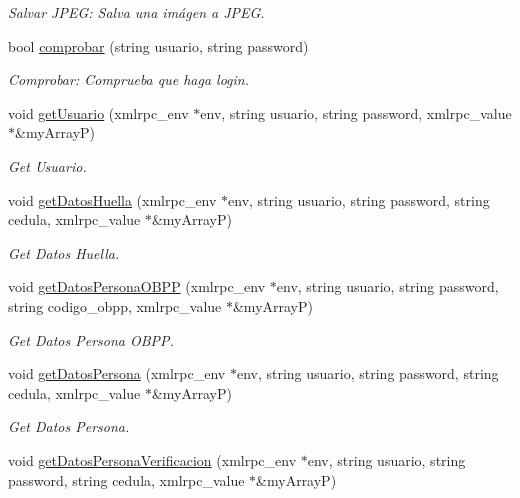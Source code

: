 \begin{DoxyCompactItemize}
\begin{DoxyCompactList}\small\item\em Salvar J\+P\+EG\+: Salva una imágen a J\+P\+EG. \end{DoxyCompactList}\item 
bool \hyperlink{classTemplateAFIS__webservice_a5491ba1e8737a0adea2527fcbbc428af}{comprobar} (string usuario, string password)
\begin{DoxyCompactList}\small\item\em Comprobar\+: Comprueba que haga login. \end{DoxyCompactList}\item 
void \hyperlink{classTemplateAFIS__webservice_a11ad395942529648ef3a9ddf43df3262}{get\+Usuario} (xmlrpc\+\_\+env $\ast$env, string usuario, string password, xmlrpc\+\_\+value $\ast$\&my\+ArrayP)
\begin{DoxyCompactList}\small\item\em Get Usuario. \end{DoxyCompactList}\item 
void \hyperlink{classTemplateAFIS__webservice_aeb75c2999e3b58cbf800b9f9ffea082c}{get\+Datos\+Huella} (xmlrpc\+\_\+env $\ast$env, string usuario, string password, string cedula, xmlrpc\+\_\+value $\ast$\&my\+ArrayP)
\begin{DoxyCompactList}\small\item\em Get Datos Huella. \end{DoxyCompactList}\item 
void \hyperlink{classTemplateAFIS__webservice_adc47efe142e56d2899f8eb8da72ab8eb}{get\+Datos\+Persona\+O\+B\+PP} (xmlrpc\+\_\+env $\ast$env, string usuario, string password, string codigo\+\_\+obpp, xmlrpc\+\_\+value $\ast$\&my\+ArrayP)
\begin{DoxyCompactList}\small\item\em Get Datos Persona O\+B\+PP. \end{DoxyCompactList}\item 
void \hyperlink{classTemplateAFIS__webservice_a096dfa38545612233dbb64006b01f3e3}{get\+Datos\+Persona} (xmlrpc\+\_\+env $\ast$env, string usuario, string password, string cedula, xmlrpc\+\_\+value $\ast$\&my\+ArrayP)
\begin{DoxyCompactList}\small\item\em Get Datos Persona. \end{DoxyCompactList}\item 
void \hyperlink{classTemplateAFIS__webservice_a88c4dc259776908b70505380256b68f8}{get\+Datos\+Persona\+Verificacion} (xmlrpc\+\_\+env $\ast$env, string usuario, string password, string cedula, xmlrpc\+\_\+value $\ast$\&my\+ArrayP)

\end{DoxyCompactItemize}
